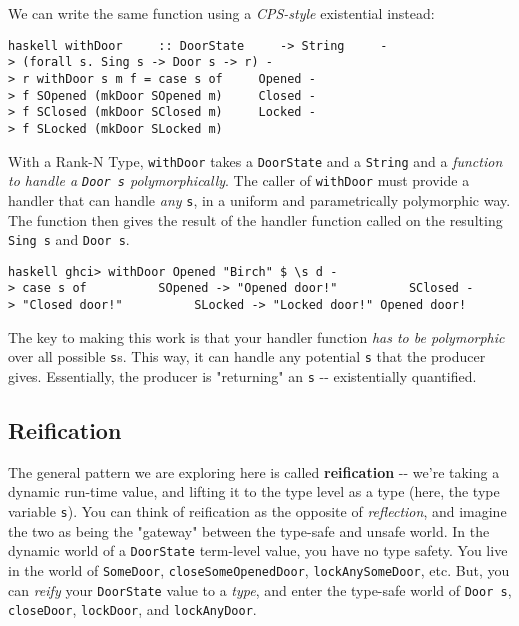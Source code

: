 \documentclass[]{article}
\begin{document}
We can write the same function using a \emph{CPS-style} existential instead:

\texttt{haskell\ withDoor\ \ \ \ \ ::\ DoorState\ \ \ \ \ -\textgreater{}\ String\ \ \ \ \ -\textgreater{}\ (forall\ s.\ Sing\ s\ -\textgreater{}\ Door\ s\ -\textgreater{}\ r)\ -\textgreater{}\ r\ withDoor\ s\ m\ f\ =\ case\ s\ of\ \ \ \ \ Opened\ -\textgreater{}\ f\ SOpened\ (mkDoor\ SOpened\ m)\ \ \ \ \ Closed\ -\textgreater{}\ f\ SClosed\ (mkDoor\ SClosed\ m)\ \ \ \ \ Locked\ -\textgreater{}\ f\ SLocked\ (mkDoor\ SLocked\ m)}

With a Rank-N Type, \texttt{withDoor} takes a \texttt{DoorState} and a
\texttt{String} and a \emph{function to handle a \texttt{Door\ s}
polymorphically}. The caller of \texttt{withDoor} must provide a handler that
can handle \emph{any} \texttt{s}, in a uniform and parametrically polymorphic
way. The function then gives the result of the handler function called on the
resulting \texttt{Sing\ s} and \texttt{Door\ s}.

\texttt{haskell\ ghci\textgreater{}\ withDoor\ Opened\ "Birch"\ \$\ \textbackslash{}s\ d\ -\textgreater{}\ case\ s\ of\ \ \ \ \ \ \ \ \ \ SOpened\ -\textgreater{}\ "Opened\ door!"\ \ \ \ \ \ \ \ \ \ SClosed\ -\textgreater{}\ "Closed\ door!"\ \ \ \ \ \ \ \ \ \ SLocked\ -\textgreater{}\ "Locked\ door!"\ Opened\ door!}

The key to making this work is that your handler function \emph{has to be
polymorphic} over all possible \texttt{s}s. This way, it can handle any
potential \texttt{s} that the producer gives. Essentially, the producer is
"returning" an \texttt{s} -\/- existentially quantified.

\subsection{Reification}

The general pattern we are exploring here is called \textbf{reification} -\/-
we're taking a dynamic run-time value, and lifting it to the type level as a
type (here, the type variable \texttt{s}). You can think of reification as the
opposite of \emph{reflection}, and imagine the two as being the "gateway"
between the type-safe and unsafe world. In the dynamic world of a
\texttt{DoorState} term-level value, you have no type safety. You live in the
world of \texttt{SomeDoor}, \texttt{closeSomeOpenedDoor},
\texttt{lockAnySomeDoor}, etc. But, you can \emph{reify} your \texttt{DoorState}
value to a \emph{type}, and enter the type-safe world of \texttt{Door\ s},
\texttt{closeDoor}, \texttt{lockDoor}, and \texttt{lockAnyDoor}.
\end{document}
